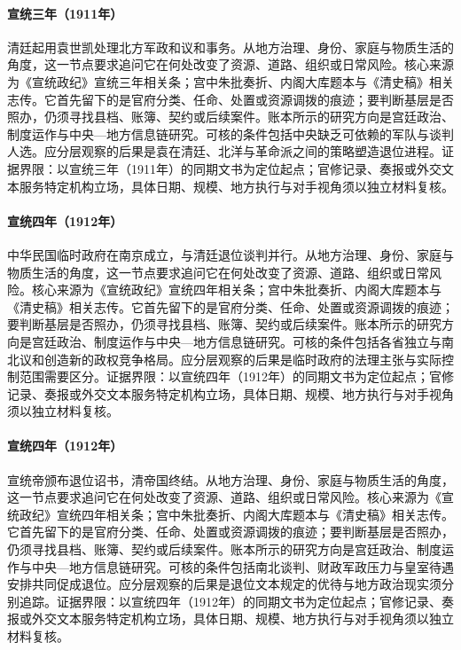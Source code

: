 \hypertarget{social:EQ-1911-YUAN-SHIKAI-RETURN}{}\paragraph{宣统三年（1911年）}清廷起用袁世凯处理北方军政和议和事务。从地方治理、身份、家庭与物质生活的角度，这一节点要求追问它在何处改变了资源、道路、组织或日常风险。核心来源为《宣统政纪》宣统三年相关条；宫中朱批奏折、内阁大库题本与《清史稿》相关志传。它首先留下的是官府分类、任命、处置或资源调拨的痕迹；要判断基层是否照办，仍须寻找县档、账簿、契约或后续案件。账本所示的研究方向是宫廷政治、制度运作与中央—地方信息链研究。可核的条件包括中央缺乏可依赖的军队与谈判人选。应分层观察的后果是袁在清廷、北洋与革命派之间的策略塑造退位进程。证据界限：以宣统三年（1911年）的同期文书为定位起点；官修记录、奏报或外交文本服务特定机构立场，具体日期、规模、地方执行与对手视角须以独立材料复核。
\hypertarget{social:EQ-1912-REPUBLIC-FOUNDING}{}\paragraph{宣统四年（1912年）}中华民国临时政府在南京成立，与清廷退位谈判并行。从地方治理、身份、家庭与物质生活的角度，这一节点要求追问它在何处改变了资源、道路、组织或日常风险。核心来源为《宣统政纪》宣统四年相关条；宫中朱批奏折、内阁大库题本与《清史稿》相关志传。它首先留下的是官府分类、任命、处置或资源调拨的痕迹；要判断基层是否照办，仍须寻找县档、账簿、契约或后续案件。账本所示的研究方向是宫廷政治、制度运作与中央—地方信息链研究。可核的条件包括各省独立与南北议和创造新的政权竞争格局。应分层观察的后果是临时政府的法理主张与实际控制范围需要区分。证据界限：以宣统四年（1912年）的同期文书为定位起点；官修记录、奏报或外交文本服务特定机构立场，具体日期、规模、地方执行与对手视角须以独立材料复核。
\hypertarget{social:EQ-1912-QING-ABDICATION}{}\paragraph{宣统四年（1912年）}宣统帝颁布退位诏书，清帝国终结。从地方治理、身份、家庭与物质生活的角度，这一节点要求追问它在何处改变了资源、道路、组织或日常风险。核心来源为《宣统政纪》宣统四年相关条；宫中朱批奏折、内阁大库题本与《清史稿》相关志传。它首先留下的是官府分类、任命、处置或资源调拨的痕迹；要判断基层是否照办，仍须寻找县档、账簿、契约或后续案件。账本所示的研究方向是宫廷政治、制度运作与中央—地方信息链研究。可核的条件包括南北谈判、财政军政压力与皇室待遇安排共同促成退位。应分层观察的后果是退位文本规定的优待与地方政治现实须分别追踪。证据界限：以宣统四年（1912年）的同期文书为定位起点；官修记录、奏报或外交文本服务特定机构立场，具体日期、规模、地方执行与对手视角须以独立材料复核。
